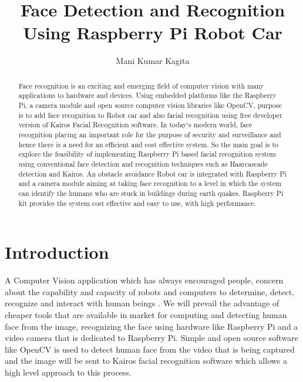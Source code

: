 \documentclass[sigconf]{acmart}
\begin{document}
\title{Face Detection and Recognition Using Raspberry Pi Robot Car}

\author{Mani Kumar Kagita}


\begin{abstract}
Face recognition is an exciting and emerging field of computer vision with many  applications to hardware and devices. Using embedded platforms like the Raspberry Pi, a camera module and open source computer vision libraries like OpenCV, purpose is to add face recognition to Robot car and also facial recognition using free developer version of Kairos Facial Recognition software.
In today`s modern world, face recognition playing an important role for the purpose of security and surveillance and hence there is a need for an efficient and cost effective system. So the main goal is to explore the feasibility of implementing Raspberry Pi based facial recognition system using conventional face detection and recognition techniques such as Haarcascade detection and Kairos. An obstacle avoidance Robot car is integrated with Raspberry Pi and a camera module aiming at taking face recognition to a level in which the system can identify the humans who are stuck in buildings during earth quakes.  Raspberry Pi kit provides the system cost effective and easy to use, with high performance.

\end{abstract}


\maketitle

\section{Introduction}
A Computer Vision application which has always encouraged people, concern about the capability and capacity of  robots and computers to determine, detect, recognize and interact with human beings \cite{Boris2014}. We will prevail the advantage of cheaper tools that are available in market for computing and detecting human face from the image, recognizing the face using hardware like Raspberry Pi and a video camera that is dedicated to Raspberry Pi. Simple and open source software like OpenCV is used to detect human face from the video that is being captured and the image will be sent to Kairos facial recognition software which allows a high level approach to this process.
\end{document}
